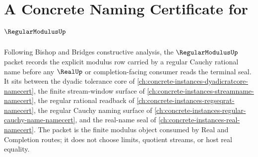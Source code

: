 \chapter{A Concrete Naming Certificate for $\RegularModulusUp$}
\label{ch:concrete-instances-regular-modulus-namecert}

Following Bishop and Bridges constructive analysis, the $\RegularModulusUp$ packet records the explicit modulus row carried by a regular Cauchy rational name before any $\RealUp$ or completion-facing consumer reads the terminal seal. It sits between the dyadic tolerance core of \autoref{ch:concrete-instances-dyadicratcore-namecert}, the finite stream-window surface of \autoref{ch:concrete-instances-streamname-namecert}, the regular rational readback of \autoref{ch:concrete-instances-regseqrat-namecert}, the regular Cauchy naming surface of \autoref{ch:concrete-instances-regular-cauchy-name-namecert}, and the real-name seal of \autoref{ch:concrete-instances-real-namecert}. The packet is the finite modulus object consumed by Real and Completion routes; it does not choose limits, quotient streams, or host real equality.


